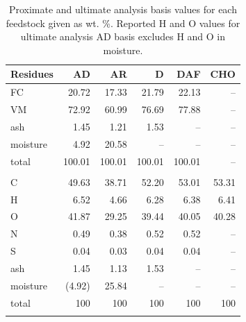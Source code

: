 \begin{center}
\footnotesize
\begin{longtable}{lrrrrr}
    \caption{Proximate and ultimate analysis basis values for each feedstock given as wt. \%. Reported H and O values for ultimate analysis AD basis excludes H and O in moisture.}
    \label{tab:basis} \\

    \textbf{Residues} & AD & AR & D & DAF & CHO \\
    \midrule
    FC       & 20.72  & 17.33  & 21.79  & 22.13  & -- \\
    VM       & 72.92  & 60.99  & 76.69  & 77.88  & -- \\
    ash      & 1.45   & 1.21   & 1.53   & --     & -- \\
    moisture & 4.92   & 20.58  & --     & --     & -- \\
    total    & 100.01 & 100.01 & 100.01 & 100.01 & -- \\
    \\
    C        & 49.63  & 38.71 & 52.20 & 53.01 & 53.31 \\
    H        & 6.52   & 4.66  & 6.28  & 6.38  & 6.41 \\
    O        & 41.87  & 29.25 & 39.44 & 40.05 & 40.28 \\
    N        & 0.49   & 0.38  & 0.52  & 0.52  & -- \\
    S        & 0.04   & 0.03  & 0.04  & 0.04  & -- \\
    ash      & 1.45   & 1.13  & 1.53  & --    & -- \\
    moisture & (4.92) & 25.84 & --    & --    & -- \\
    total    & 100    & 100   & 100   & 100   & 100 \\
    \\


\end{longtable}
\end{center}
